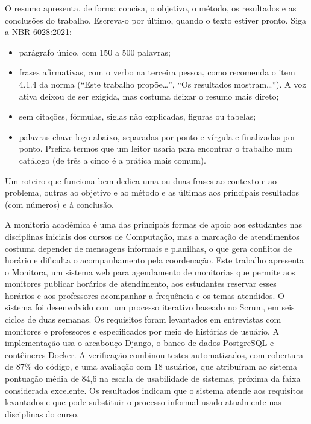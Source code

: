 \begin{resumo}
\begin{instrucao}
O resumo apresenta, de forma concisa, o objetivo, o método, os resultados e as
conclusões do trabalho. Escreva-o por último, quando o texto estiver pronto.
Siga a NBR 6028:2021:
\begin{itemize}
  \item parágrafo único, com 150 a 500 palavras;
  \item frases afirmativas, com o verbo na terceira pessoa, como recomenda o
        item 4.1.4 da norma (``Este trabalho propõe\ldots'', ``Os resultados
        mostram\ldots''). A voz ativa deixou de ser exigida, mas costuma
        deixar o resumo mais direto;
  \item sem citações, fórmulas, siglas não explicadas, figuras ou tabelas;
  \item palavras-chave logo abaixo, separadas por ponto e vírgula e finalizadas
        por ponto. Prefira termos que um leitor usaria para encontrar o
        trabalho num catálogo (de três a cinco é a prática mais comum).
\end{itemize}
Um roteiro que funciona bem dedica uma ou duas frases ao contexto e ao
problema, outras ao objetivo e ao método e as últimas aos principais
resultados (com números) e à conclusão.
\end{instrucao}

A monitoria acadêmica é uma das principais formas de apoio aos estudantes nas
disciplinas iniciais dos cursos de Computação, mas a marcação de atendimentos
costuma depender de mensagens informais e planilhas, o que gera conflitos de
horário e dificulta o acompanhamento pela coordenação. Este trabalho apresenta
o Monitora, um sistema web para agendamento de monitorias que permite aos
monitores publicar horários de atendimento, aos estudantes reservar esses
horários e aos professores acompanhar a frequência e os temas atendidos. O
sistema foi desenvolvido com um processo iterativo baseado no Scrum, em seis
ciclos de duas semanas. Os requisitos foram levantados em entrevistas com
monitores e professores e especificados por meio de histórias de usuário. A
implementação usa o arcabouço Django, o banco de dados PostgreSQL e
contêineres Docker. A verificação combinou testes automatizados, com cobertura
de 87\% do código, e uma avaliação com 18 usuários, que atribuíram ao sistema
pontuação média de 84,6 na escala de usabilidade de sistemas, próxima da faixa
considerada excelente. Os resultados indicam que o sistema atende aos requisitos
levantados e que pode substituir o processo informal usado atualmente nas
disciplinas do curso.

\end{resumo}
